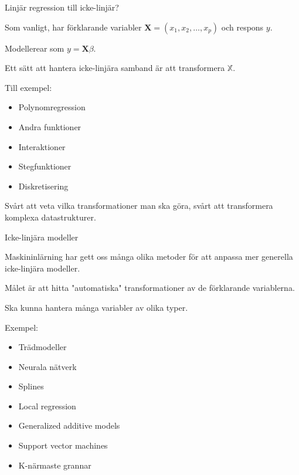 \documentclass[10pt,english]{beamer}
\begin{document}
\begin{frame}{Linjär regression till icke-linjär?}
    
    Som vanligt, har förklarande variabler $\mathbf{X} = (x_1, x_2, \ldots, x_p)$ och respons $y$.

    Modellerear som $y = \mathbf{X}\beta$.

    Ett sätt att hantera icke-linjära samband är att transformera $\mathbb{X}$.

    Till exempel:
    \begin{itemize}
        \item Polynomregression
        \item Andra funktioner
        \item Interaktioner
        \item Stegfunktioner
        \item Diskretisering
    \end{itemize}

    Svårt att veta vilka transformationer man ska göra, svårt att transformera komplexa datastrukturer.

\end{frame}

\begin{frame}{Icke-linjära modeller}
    
    Maskininlärning har gett oss många olika metoder för att anpassa mer generella icke-linjära modeller.

    \begin{greenbox}
        Målet är att hitta "automatiska" transformationer av de förklarande variablerna.
    \end{greenbox}

    Ska kunna hantera många variabler av olika typer.

    Exempel:
    \begin{itemize}
        \item Trädmodeller
        \item Neurala nätverk
        \item Splines
        \item Local regression
        \item Generalized additive models
        \item Support vector machines
        \item K-närmaste grannar
    \end{itemize}

\end{frame}
\end{document}
